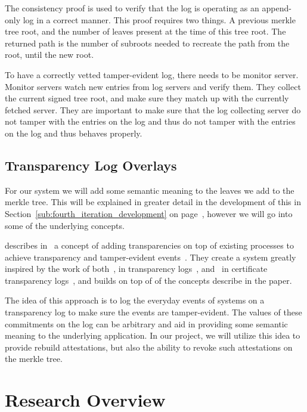 \documentclass[../Main/thesis.tex]{subfiles}
\begin{document}
The consistency proof is used to verify that the log is operating as an
append-only log in a correct manner. This proof requires two things. A
previous merkle tree root, and the number of leaves present at the time of
this tree root. The returned path is the number of subroots needed to
recreate the path from the root, until the new root.

To have a correctly vetted tamper-evident log, there needs to be monitor server.
Monitor servers watch new entries from log servers and verify them. They collect
the current signed tree root, and make sure they match up with the currently
fetched server. They are important to make sure that the log collecting server
do not tamper with the entries on the log and thus do not tamper with the
entries on the log and thus behaves properly.

\subsection*{Transparency Log Overlays}%
\label{sub:transparency_log_overlays}
For our system we will add some semantic meaning to the leaves we add to the
merkle tree. This will be explained in greater detail in the development of
this in Section~\ref{sub:fourth_iteration_development} on
page~\pageref{sub:fourth_iteration_development}, however we will go into some of
the underlying concepts.

\citeauthor{10.11452976749.2978404} describes
in~ a concept of adding transparencies on top
of existing processes to achieve transparency and tamper-evident
events~\cite{10.11452976749.2978404}. They create a system greatly inspired by
the work of both~\citeauthor{182788}, in transparency logs~\cite{182788},
and~\citeauthor{b.-laurie-a.-langley-e.kaster-google-2013} in certificate
transparency logs~\cite{b.-laurie-a.-langley-e.kaster-google-2013}, and builds
on top of of the concepts describe in the paper.

The idea of this approach is to log the everyday events of systems on a
transparency log to make sure the events are tamper-evident. The values of these
commitments on the log can be arbitrary and aid in providing some semantic
meaning to the underlying application. In our project, we will utilize this idea
to provide rebuild attestations, but also the ability to revoke such attestations
on the merkle tree.

\section{Research Overview}%
\label{sec:research_overview}
\end{document}
